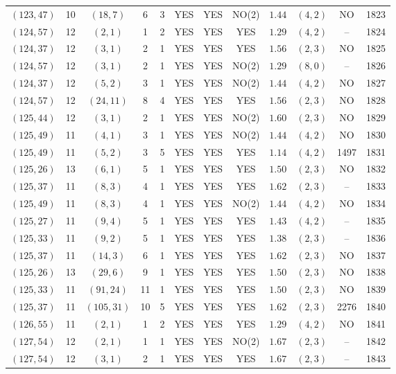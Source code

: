 \begin{longtable}{|c|c|c|c|c|c|c|c|c|c|c|c|}
$(123,47)$ & 10 & $(18,7)$ & 6 & 3 & YES & YES & NO(2) & $1.44$ & $(4,2)$ & NO & 1823\\
$(124,57)$ & 12 & $(2,1)$ & 1 & 2 & YES & YES & YES & $1.29$ & $(4,2)$ & -- & 1824\\
$(124,37)$ & 12 & $(3,1)$ & 2 & 1 & YES & YES & YES & $1.56$ & $(2,3)$ & NO & 1825\\
$(124,57)$ & 12 & $(3,1)$ & 2 & 1 & YES & YES & NO(2) & $1.29$ & $(8,0)$ & -- & 1826\\
$(124,37)$ & 12 & $(5,2)$ & 3 & 1 & YES & YES & NO(2) & $1.44$ & $(4,2)$ & NO & 1827\\
$(124,57)$ & 12 & $(24,11)$ & 8 & 4 & YES & YES & YES & $1.56$ & $(2,3)$ & NO & 1828\\
$(125,44)$ & 12 & $(3,1)$ & 2 & 1 & YES & YES & NO(2) & $1.60$ & $(2,3)$ & NO & 1829\\
$(125,49)$ & 11 & $(4,1)$ & 3 & 1 & YES & YES & NO(2) & $1.44$ & $(4,2)$ & NO & 1830\\
$(125,49)$ & 11 & $(5,2)$ & 3 & 5 & YES & YES & YES & $1.14$ & $(4,2)$ & 1497 & 1831\\
$(125,26)$ & 13 & $(6,1)$ & 5 & 1 & YES & YES & YES & $1.50$ & $(2,3)$ & NO & 1832\\
$(125,37)$ & 11 & $(8,3)$ & 4 & 1 & YES & YES & YES & $1.62$ & $(2,3)$ & -- & 1833\\
$(125,49)$ & 11 & $(8,3)$ & 4 & 1 & YES & YES & NO(2) & $1.44$ & $(4,2)$ & NO & 1834\\
$(125,27)$ & 11 & $(9,4)$ & 5 & 1 & YES & YES & YES & $1.43$ & $(4,2)$ & -- & 1835\\
$(125,33)$ & 11 & $(9,2)$ & 5 & 1 & YES & YES & YES & $1.38$ & $(2,3)$ & -- & 1836\\
$(125,37)$ & 11 & $(14,3)$ & 6 & 1 & YES & YES & YES & $1.62$ & $(2,3)$ & NO & 1837\\
$(125,26)$ & 13 & $(29,6)$ & 9 & 1 & YES & YES & YES & $1.50$ & $(2,3)$ & NO & 1838\\
$(125,33)$ & 11 & $(91,24)$ & 11 & 1 & YES & YES & YES & $1.50$ & $(2,3)$ & NO & 1839\\
$(125,37)$ & 11 & $(105,31)$ & 10 & 5 & YES & YES & YES & $1.62$ & $(2,3)$ & 2276 & 1840\\
$(126,55)$ & 11 & $(2,1)$ & 1 & 2 & YES & YES & YES & $1.29$ & $(4,2)$ & NO & 1841\\
$(127,54)$ & 12 & $(2,1)$ & 1 & 1 & YES & YES & NO(2) & $1.67$ & $(2,3)$ & -- & 1842\\
$(127,54)$ & 12 & $(3,1)$ & 2 & 1 & YES & YES & YES & $1.67$ & $(2,3)$ & -- & 1843\\

\end{longtable}
